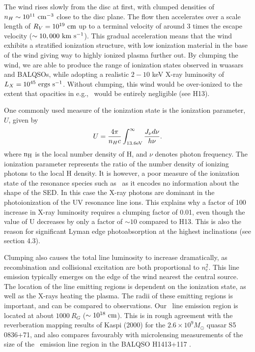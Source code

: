 \documentclass[useAMS,usenatbib]{mn2e_x}
\begin{document}
The wind rises slowly from the disc at first, with clumped densities
of $n_H \sim 10^{11}~\rm{cm^{-3}}$ close to the disc plane.
The flow then accelerates over a scale length of $R_V=10^{19}~\rm{cm}$
up to a terminal velocity of around $3$ times the escape velocity 
($\sim10,000~\rm{km~s^{-1}}$). This gradual acceleration means that
the wind exhibits a stratified ionization structure, with low ionization material
in the base of the wind giving way to highly ionized plasma further out.
By clumping the wind, we are able to produce the range of ionization states observed
in wuasars and BALQSOs, while adopting a realistic $2-10$ keV X-ray luminosity
of $L_{X}=10^{45}~\rm{ergs~s^{-1}}$. Without clumping, this wind would be over-ionized 
to the extent that opacities in e.g., \civ\ would be entirely negligible (see H13).

One commonly used measure of the ionization state is the ionization parameter, $U$, given by
\begin{equation}
U = \frac{4\pi}{n_H c}\int_{13.6{\rm{eV}}}^{\infty}\frac{{J_{\nu}d\nu}}{h\nu}.
\end{equation}
\noindent where $\rm{n_H}$ is the local number density of H, and $\nu$ denotes photon 
frequency. The ionization parameter represents the ratio of the number density of 
ionizing photons to the local H density. It is however, a poor measure of the 
ionization state of the resonance species such as \civ\ as it encodes no information
about the shape of the SED. In this case the X-ray photons 
are dominant in the photoionization of the UV resonance line ions. 
This explains why a factor of 100 increase in X-ray luminosity requires
a clumping factor of 0.01, even though the value of U decreases by only a factor of $\sim10$ 
compared to H13. This is also the reason for significant Lyman edge photoabsorption
at the highest inclinations (see section 4.3).

Clumping also causes the total line luminosity to increase dramatically,
as recombination and collisional excitation are both proportional to
$n_e^2$. This line emission typically emerges on the edge of the wind
nearest the central source. The location of the line emitting regions
is dependent on the ionization state, as well as the X-rays heating the plasma.
The radii of these emitting regions is important,
and can be compared to observations. Our \civ\ line emission region 
is located at about $1000~R_G$ ($\sim10^{18}~\rm{cm}$).
This is in rough agreement with the reverberation mapping 
results of Kaspi (2000) for the $2.6\times10^{9} M_\odot$ quasar S5 0836+71,
and also compares favourably with microlensing measurements of the size of the
\civ\ emission line region in the BALQSO H1413+117 \citep{odowd2015}.
\end{document}
